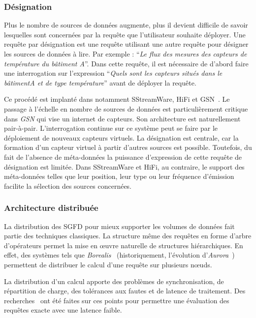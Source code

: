 \subsubsection{Désignation}\label{sec:rw:sgfd:infra:designation}
Plus le nombre de sources de données augmente, plus il devient difficile de savoir lesquelles sont concernées par la requête que l'utilisateur souhaite déployer. Une requête par désignation est une requête utilisant une autre requête pour désigner les sources de données à lire. Par exemple : \enquote{\it Le flux des mesures des capteurs de température du bâtiment A}. Dans cette requête, il est nécessaire de d'abord faire une interrogation sur l'expression \enquote{\it Quels sont les capteurs situés dans le bâtiment\textit{A} et de type \textit{température}} avant de déployer la requête.

Ce procédé est implanté dans notamment SStreamWare, HiFi et GSN~\cite{Aberer:gsn}. Le passage à l'échelle en nombre de sources de données est particulièrement critique dans \textit{GSN} qui vise un internet de capteurs. Son architecture est naturellement pair-à-pair. L'interrogation continue sur ce système peut se faire par le déploiement de nouveaux capteurs virtuels. La désignation est centrale, car la formation d'un capteur virtuel à partir d'autres sources est possible. Toutefois, du fait de l'absence de méta-données la puissance d'expression de cette requête de désignation est limitée. Dans SStreamWare et HiFi, au contraire, le support des méta-données telles que leur position, leur type ou leur fréquence d'émission facilite la sélection des sources concernées.

\subsubsection{Architecture distribuée}
La distribution des SGFD pour mieux supporter les volumes de données fait partie des techniques classiques. La structure même des requêtes en forme d'arbre d'opérateurs permet la mise en œuvre naturelle de structures hiérarchiques. En effet, des systèmes tels que \textit{Borealis}~\cite{Abadi:borealis} (historiquement, l'évolution d'\textit{Aurora}~\cite{Abadi:aurora}) permettent de distribuer le calcul d'une requête sur plusieurs nœuds.

La distribution d'un calcul apporte des problèmes de synchronisation, de répartition de charge, des tolérances aux fautes et de latence de traitement. Des recherches~\cite{Hwang:distributed, Tucker:heartbeat} ont été faites sur ces points pour permettre une évaluation des requêtes exacte avec une latence faible.

